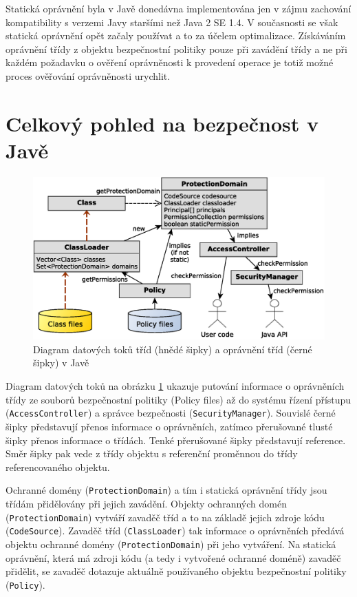 Statická oprávnění byla v Javě donedávna implementována jen v zájmu zachování kompatibility s verzemi Javy staršími než Java 2 SE 1.4. \cite{sourceProtectionDomain}
V současnosti se však statická oprávnění opět začaly používat a to za účelem optimalizace.
Získáváním oprávnění třídy z objektu bezpečnostní politiky pouze při zavádění třídy a ne při každém požadavku o ověření oprávněnosti k provedení operace je totiž možné proces ověřování oprávněnosti urychlit.

\section{Celkový pohled na bezpečnost v Javě} \label{celkovyPohled}

\begin{figure}[ht]
  \centering
  \includegraphics[width=14cm]{fig/domain-schema}
  \caption{Diagram datových toků tříd (hnědé šipky) a oprávnění tříd (černé šipky) v Javě}
  \label{diagramDatovychToku}
\end{figure}

Diagram datových toků na obrázku \ref{diagramDatovychToku} ukazuje putování informace o oprávněních třídy ze souborů bezpečnostní politiky (Policy files) až do systému řízení přístupu ({\tt AccessController}) a správce bezpečnosti ({\tt SecurityManager}). Souvislé černé šipky představují přenos informace o oprávněních, zatímco přerušované tlusté šipky přenos informace o třídách. Tenké přerušované šipky představují reference. Směr šipky pak vede z třídy objektu s referenční proměnnou do třídy referencovaného objektu.

Ochranné domény ({\tt ProtectionDomain}) a tím i statická oprávnění třídy jsou třídám přidělovány při jejich zavádění.
Objekty ochranných domén ({\tt ProtectionDomain}) vytváří zavaděč tříd a to na základě jejich zdroje kódu ({\tt CodeSource}).
Zavaděč tříd ({\tt ClassLoader}) tak informace o oprávněních předává objektu ochranné domény ({\tt ProtectionDomain}) při jeho vytváření.
Na statická oprávnění, která má zdroji kódu (a tedy i vytvořené ochranné doméně) zavaděč přidělit, se zavaděč dotazuje aktuálně používaného objektu bezpečnostní politiky ({\tt Policy}).

